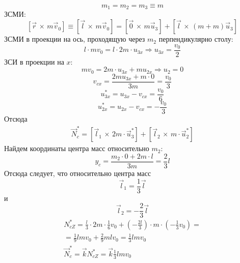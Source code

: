 \documentclass[a5paper,10pt]{article}
\begin{document}
\begin{equation*}
    m_1=m_2=m_3\equiv m
\end{equation*}
ЗСМИ:
\begin{equation}
    \label{eq1}
    [\vec{r}\,\times\,{m\vec{v}_0}]
    \equiv [\vec{l}\,\times\,{m\vec{v}_0}]=
    [\vec{0}\,\times\,{m\vec{u}_3}]+
    [\vec{l}\,\times\,{(m+m)\vec{u}_3}]
\end{equation}
ЗСМИ в проекции на ось, проходящую через $m_2$ перпендикулярно столу:
\begin{equation}
    \label{eq:zsmi}
    l\cdot mv_0 = 
                l\cdot 2m\cdot u_{3x}
                \Rightarrow
                u_{3x}=\frac{v_0}{2}
\end{equation}
ЗСИ в проекции на $x$:
\begin{equation}
    mv_0=
        2m\cdot u_{3x}+mu_{2x}
        \Rightarrow
        u_{2}=0 
\end{equation}
\begin{equation}
    v_{cx}=
            \frac{2mu_{3x}+
            m\cdot0}{3m}=
            \frac{v_0}{3}
\end{equation}
\begin{equation}
    u_{3x}^*=
        u_{3x}-v_{cx}=
        \frac{v_0}{6}
\end{equation}
\begin{equation}
    u_{2x}^*=
            u_{2x}-v_{cx}=
            -\frac{v_0}{3}
\end{equation}
Отсюда
\begin{gather}
    \vec{N}_c^*=
        \left[{\vec{l}_1} \,\times\, 2m\cdot \vec{u}_{3}^*\right]+
        \left[{\vec{l}_2} \,\times\, m\cdot \vec{u}_{2}^*\right]
\end{gather}
Найдем координаты центра масс относительно $m_2$:
\begin{equation}
    y_c=\frac{m_2\cdot0+2m\cdot l}{3m}=\frac23l
\end{equation}
Отсюда следует, что относительно центра масс
\begin{equation}
    \vec{l}_1=\frac13\vec{l}
\end{equation}
и
\begin{equation}
    \vec{l}_2=-\frac23\vec{l}
\end{equation}
\begin{gather}
    N_{cZ}^*=\frac{l}{3}\cdot2m\cdot\frac16v_0+\left(-\frac{2l}3\right)\cdot m\cdot\left(-\frac13v_0\right)=\\=
    \frac19lmv_0+\frac29mlv_0=\frac13lmv_0\\
    \vec{N}_c^*=\vec{k}N_{cZ}^*=\vec{k}\frac13lmv_0
\end{gather}
\end{document}
